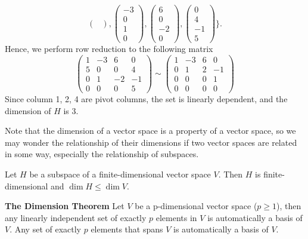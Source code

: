 \documentclass[10pt, a4paper]{article}
\begin{document}
\begin{example}
$$\begin{pmatrix}
    \end{pmatrix}, \begin{pmatrix}
        -3\\0\\1\\0
    \end{pmatrix}, \begin{pmatrix}
        6\\0\\-2\\0
    \end{pmatrix}, \begin{pmatrix}
        0\\4\\-1\\5
    \end{pmatrix}\}.$$
    Hence, we perform row reduction to the following matrix
    \[
    \begin{pmatrix}
        1 & -3 & 6 & 0\\
        5 & 0 & 0 & 4\\
        0 & 1 & -2 & -1\\
        0 & 0 & 0 & 5
    \end{pmatrix}
    \sim \begin{pmatrix}
        1&-3&6&0\\
        0&1&2&-1\\
        0&0&0&1\\
        0&0&0&0
    \end{pmatrix}
    \]
    Since column 1, 2, 4 are pivot columns, the set is linearly dependent, and the dimension of $H$ is 3.
\end{example}

\indent Note that the dimension of a vector space is a property of a vector space, so we may wonder the relationship of their dimensions if two vector spaces are related in some way, especially the relationship of subspaces.
\begin{proposition}
    Let $H$ be a subspace of a finite-dimensional vector space $V$. Then $H$ is finite-dimensional and $\dim H\leq \dim V$. 
\end{proposition}
\begin{proposition}
    \textbf{The Dimension Theorem} Let $V$ be a p-dimensional vector space ($p\geq1$), then any linearly independent set of exactly $p$ elements in $V$ is automatically a basis of $V$.
    Any set of exactly $p$ elements that spans $V$ is automatically a basis of $V$.
\end{proposition}
\end{document}
